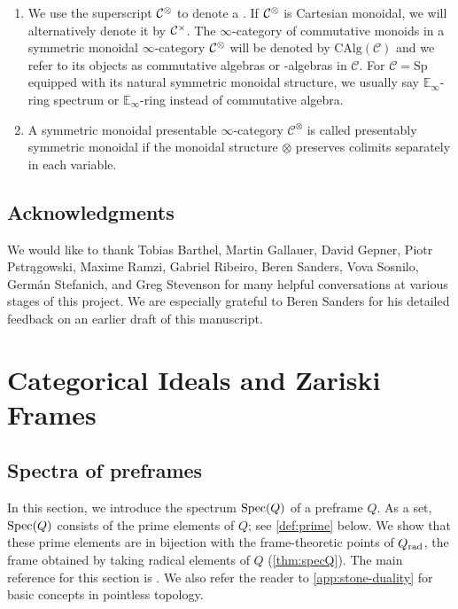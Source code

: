 \documentclass[10pt,a4paper,oneside]{article}
\begin{document}
\begin{enumerate}[label=(\alph*)]
\item  We use the superscript \(\mathcal{C}^\otimes\) to denote a \syminfcat. If $\mathcal{C}^\otimes$ is Cartesian monoidal, we will alternatively denote it by $\mathcal{C}^\times$. The $\infty$-category of commutative monoids in a symmetric monoidal $\infty$-category $\mathcal{C}^\otimes$ will be denoted by $\mathrm{CAlg}(\mathcal{C})$ and we refer to its objects as commutative algebras or \ein-algebras in $\mathcal{C}$. For $\mathcal{C}=\mathrm{Sp}$ equipped with its natural symmetric monoidal structure, we usually say $\mathbb{E}_{\infty}$-ring spectrum or $\mathbb{E}_{\infty}$-ring instead of commutative algebra.
\item  A symmetric monoidal presentable $\infty$-category $\mathcal{C}^\otimes$ is called presentably symmetric monoidal if the monoidal structure $\otimes$ preserves colimits separately in each variable.
\end{enumerate}

\subsection*{Acknowledgments}

We would like to thank Tobias Barthel, Martin Gallauer, David Gepner, Piotr Pstr\k{a}gowski, Maxime Ramzi, Gabriel Ribeiro, Beren Sanders, Vova Sosnilo, Germ\'an Stefanich, and Greg Stevenson for many helpful conversations at various stages of this project. We are especially grateful to Beren Sanders for his detailed feedback on an earlier draft of this manuscript.

\section{Categorical Ideals and Zariski Frames}\label{sec:zar}

\subsection{Spectra of preframes}
In this section, we introduce the spectrum $\operatorname{Spec}(Q)$ of a preframe $Q$. As a set, $\operatorname{Spec}(Q)$ consists of the prime elements of $Q$; see \cref{def:prime} below. We show that these prime elements are in bijection with the frame-theoretic points of $Q_{\operatorname{rad}}$, the frame obtained by taking radical elements of $Q$ (\cref{thm:specQ}). The main reference for this section is \cite[Appendix A]{anel2023left}. We also refer the reader to \cref{app:stone-duality} for basic concepts in pointless topology.
\end{document}
